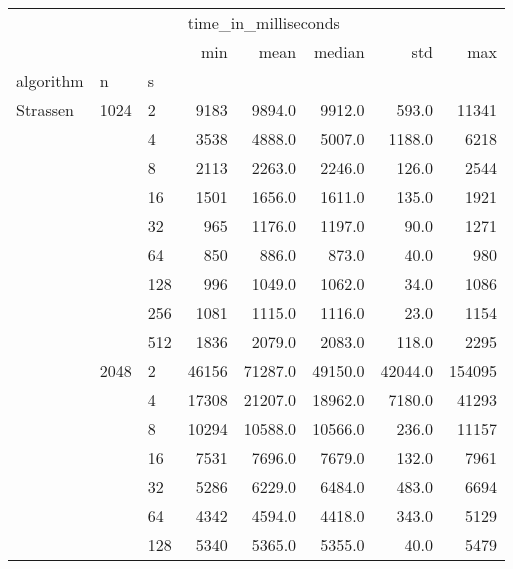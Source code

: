 \begin{tabular}{lllrrrrr}
\toprule
         &      &      & \multicolumn{5}{l}{time\_in\_milliseconds} \\
         &      &      &                  min &      mean &    median &      std &     max \\
algorithm & n & s &                      &           &           &          &         \\
\midrule
Strassen & 1024 & 2    &                 9183 &    9894.0 &    9912.0 &    593.0 &   11341 \\
         &      & 4    &                 3538 &    4888.0 &    5007.0 &   1188.0 &    6218 \\
         &      & 8    &                 2113 &    2263.0 &    2246.0 &    126.0 &    2544 \\
         &      & 16   &                 1501 &    1656.0 &    1611.0 &    135.0 &    1921 \\
         &      & 32   &                  965 &    1176.0 &    1197.0 &     90.0 &    1271 \\
         &      & 64   &                  850 &     886.0 &     873.0 &     40.0 &     980 \\
         &      & 128  &                  996 &    1049.0 &    1062.0 &     34.0 &    1086 \\
         &      & 256  &                 1081 &    1115.0 &    1116.0 &     23.0 &    1154 \\
         &      & 512  &                 1836 &    2079.0 &    2083.0 &    118.0 &    2295 \\
         & 2048 & 2    &                46156 &   71287.0 &   49150.0 &  42044.0 &  154095 \\
         &      & 4    &                17308 &   21207.0 &   18962.0 &   7180.0 &   41293 \\
         &      & 8    &                10294 &   10588.0 &   10566.0 &    236.0 &   11157 \\
         &      & 16   &                 7531 &    7696.0 &    7679.0 &    132.0 &    7961 \\
         &      & 32   &                 5286 &    6229.0 &    6484.0 &    483.0 &    6694 \\
         &      & 64   &                 4342 &    4594.0 &    4418.0 &    343.0 &    5129 \\
         &      & 128  &                 5340 &    5365.0 &    5355.0 &     40.0 &    5479 \\

\end{tabular}
